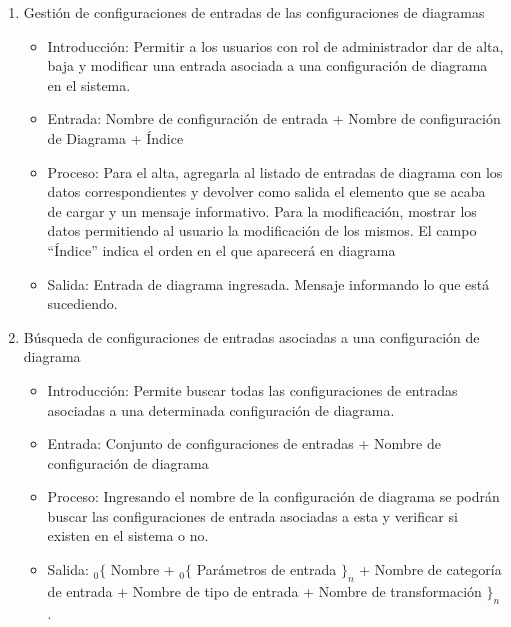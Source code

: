 \begin{enumerate}
			\item  Gestión de configuraciones de entradas de las configuraciones de diagramas
				\begin{itemize}
					\item Introducción: Permitir a los usuarios con rol de administrador dar de alta, baja y modificar una entrada asociada a una configuración de diagrama en el sistema.
					\item Entrada: Nombre de configuración de entrada + Nombre de configuración de Diagrama + Índice
					\item Proceso: Para el alta, agregarla al listado de entradas de diagrama con los datos correspondientes y devolver como salida el elemento que se acaba de cargar y un mensaje informativo.
					Para la modificación, mostrar los datos permitiendo al usuario la modificación de los mismos.
					El campo ``Índice'' indica el orden en el que aparecerá en diagrama
					\item Salida: Entrada de diagrama ingresada. Mensaje informando lo que está sucediendo.
				\end{itemize}
				
			\item Búsqueda de configuraciones de entradas asociadas a una configuración de diagrama
				\begin{itemize}
					\item Introducción: Permite buscar todas las configuraciones de entradas asociadas a una determinada configuración de diagrama.
					\item Entrada: Conjunto de configuraciones de entradas + Nombre de configuración de diagrama
					\item Proceso: Ingresando el nombre de la configuración de diagrama se podrán buscar las configuraciones de entrada asociadas a esta y verificar si existen en el sistema o no.
					\item Salida: ${}_{0}\{$ Nombre + ${}_{0}\{$ Parámetros de entrada $\}_n$ + Nombre de categoría de entrada + Nombre de tipo de entrada + Nombre de transformación $\}_n$.
				\end{itemize}


\end{enumerate}
